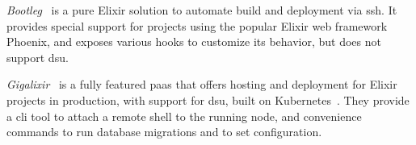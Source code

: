 \emph{Bootleg}~\cite{bootleg} is a pure Elixir solution to automate build and deployment via \acrshort{ssh}. It provides special support for projects using the popular Elixir web framework Phoenix, and exposes various hooks to customize its behavior, but does not support \acrshort{dsu}.

\emph{Gigalixir}~\cite{gigalixir} is a fully featured \acrfull{paas} that offers hosting and deployment for Elixir projects in production, with support for \acrshort{dsu}, built on Kubernetes~\cite{bernstein2014containers}. They provide a \acrshort{cli} tool to attach a remote shell to the running node, and convenience commands to run database migrations and to set configuration.
